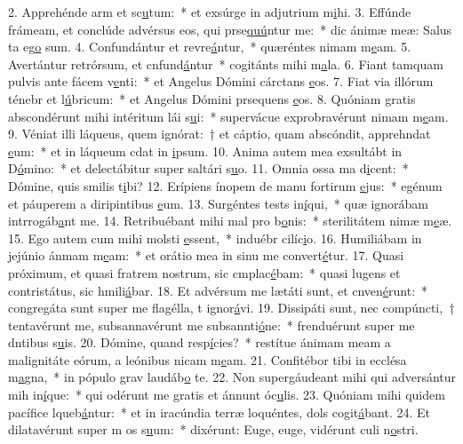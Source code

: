 2. Apprehénde arm et sc\uline{u}tum:~* et exsúrge in adjutrium m\uline{i}hi.
3. Effúnde frámeam, et conclúde advérsus eos, qui prse\uline{quú}ntur me:~* dic ánimæ meæ: Salus ta eg\uline{o} sum.
4. Confundántur et revre\uline{á}ntur,~* quæréntes nimam m\uline{e}am.
5. Avertántur retrórsum, et cnfund\uline{á}ntur~* cogitánts mihi m\uline{a}la.
6. Fiant tamquam pulvis ante fácem v\uline{e}nti:~* et Angelus Dómini cárctans \uline{e}os.
7. Fiat via illórum ténebr et l\uline{ú}bricum:~* et Angelus Dómini prsequens \uline{e}os.
8. Quóniam gratis abscondérunt mihi intéritum lái s\uline{u}i:~* supervácue exprobravérunt nimam m\uline{e}am.
9. Véniat illi láqueus, quem ignórat:~† et cáptio, quam abscóndit, apprehndat \uline{e}um:~* et in láqueum cdat in \uline{i}psum.
10. Anima autem mea exsultábt in D\uline{ó}mino:~* et delectábitur super saltári s\uline{u}o.
11. Omnia ossa ma d\uline{i}cent:~* Dómine, quis smilis t\uline{i}bi?
12. Erípiens ínopem de manu fortirum \uline{e}jus:~* egénum et páuperem a diripintibus \uline{e}um.
13. Surgéntes tests in\uline{í}qui,~* quæ ignorábam intrrogáb\uline{a}nt me.
14. Retribuébant mihi mal pro b\uline{o}nis:~* sterilitátem nimæ m\uline{e}æ.
15. Ego autem cum mihi molsti \uline{e}ssent,~* induébr cilíc\uline{i}o.
16. Humiliábam in jejúnio ánmam m\uline{e}am:~* et orátio mea in sinu me convert\uline{é}tur.
17. Quasi próximum, et quasi fratrem nostrum, sic cmplac\uline{é}bam:~* quasi lugens et contristátus, sic hmili\uline{á}bar.
18. Et advérsum me lætáti sunt, et cnven\uline{é}runt:~* congregáta sunt super me flagélla, t ignor\uline{á}vi.
19. Dissipáti sunt, nec compúncti,~† tentavérunt me, subsannavérunt me subsannti\uline{ó}ne:~* frenduérunt super me dntibus s\uline{u}is.
20. Dómine, quand resp\uline{í}cies?~* restítue ánimam meam a malignitáte eórum, a leónibus nicam m\uline{e}am.
21. Confitébor tibi in ecclésa m\uline{a}gna,~* in pópulo grav laudáb\uline{o} te.
22. Non supergáudeant mihi qui adversántur mih in\uline{í}que:~* qui odérunt me gratis et ánnunt óc\uline{u}lis.
23. Quóniam mihi quidem pacífice lqueb\uline{á}ntur:~* et in iracúndia terræ loquéntes, dols cogit\uline{á}bant.
24. Et dilatavérunt super m os s\uline{u}um:~* dixérunt: Euge, euge, vidérunt culi n\uline{o}stri.
